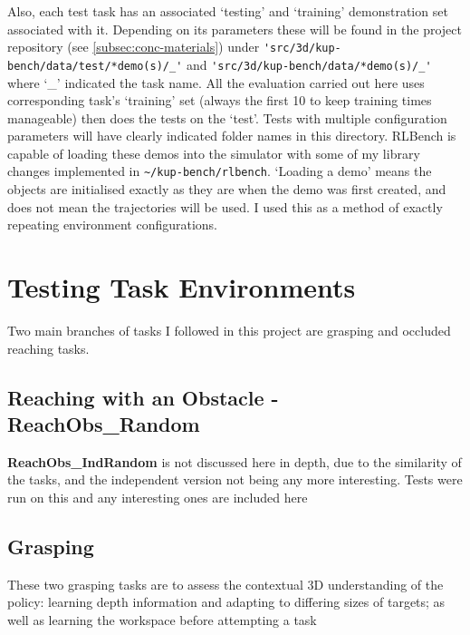 Also, each test task has an associated `testing' and `training' demonstration set associated with it. Depending on its parameters these will be found in the project repository (see \ref{subsec:conc-materials}) under \verb|'src/3d/kup-bench/data/test/*demo(s)/_'| and \verb|'src/3d/kup-bench/data/*demo(s)/_'| where `\_' indicated the task name. All the evaluation carried out here uses corresponding task's `training' set (always the first 10 to keep training times manageable) then does the tests on the `test'. Tests with multiple configuration parameters will have clearly indicated folder names in this directory. RLBench is capable of loading these demos into the simulator with some of my library changes implemented in \verb|~/kup-bench/rlbench|. `Loading a demo' means the objects are initialised exactly as they are when the demo was first created, and does not mean the trajectories will be used. I used this as a method of exactly repeating environment configurations.

\section{Testing Task Environments}
Two main branches of tasks I followed in this project are grasping and occluded reaching tasks.

\subsection{Reaching with an Obstacle - \textbf{ReachObs\_Random}}\label{eval-setup-reach-obs}

\textbf{ReachObs\_IndRandom} is not discussed here in depth, due to the similarity of the tasks, and the independent version not being any more interesting. Tests were run on this and any interesting ones are included here 

\subsection{Grasping}
These two grasping tasks are to assess the contextual 3D understanding of the policy: learning depth information and adapting to differing sizes of targets; as well as learning the workspace before attempting a task 

